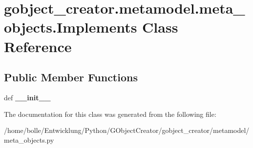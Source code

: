 \hypertarget{classgobject__creator_1_1metamodel_1_1meta__objects_1_1Implements}{
\section{gobject\_\-creator.metamodel.meta\_\-objects.Implements Class Reference}
\label{classgobject__creator_1_1metamodel_1_1meta__objects_1_1Implements}
}
\subsection*{Public Member Functions}
\begin{DoxyCompactItemize}
\item 
\hypertarget{classgobject__creator_1_1metamodel_1_1meta__objects_1_1Implements_a79b27ce6b3678d9ba60f28ca54f52f1a}{
def {\bfseries \_\-\_\-init\_\-\_\-}}
\label{classgobject__creator_1_1metamodel_1_1meta__objects_1_1Implements_a79b27ce6b3678d9ba60f28ca54f52f1a}

\end{DoxyCompactItemize}


The documentation for this class was generated from the following file:\begin{DoxyCompactItemize}
\item 
/home/bolle/Entwicklung/Python/GObjectCreator/gobject\_\-creator/metamodel/meta\_\-objects.py\end{DoxyCompactItemize}
